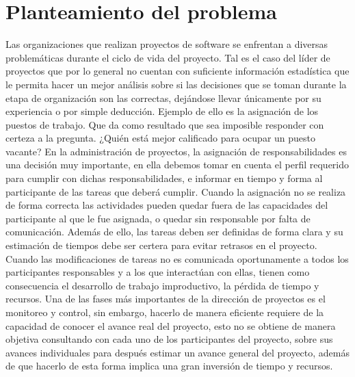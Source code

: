 \section{Planteamiento del problema }

Las organizaciones que realizan proyectos de software se enfrentan a diversas problemáticas durante el ciclo de vida del proyecto. Tal es el caso del líder de proyectos que por lo general no cuentan con suficiente información estadística que le permita hacer un mejor análisis sobre si las decisiones que se toman durante la etapa de organización son las correctas, dejándose llevar únicamente por su experiencia o por simple deducción. Ejemplo de ello es la asignación de los puestos de trabajo. Que da como resultado que sea imposible responder con certeza a la pregunta. ¿Quién está mejor calificado para ocupar un puesto vacante? 
\newline \newline
En la administración de proyectos, la asignación de responsabilidades es una decisión muy importante, en ella debemos tomar en cuenta el perfil requerido para cumplir con dichas responsabilidades, e informar en tiempo y forma al participante de las tareas que deberá cumplir. Cuando la asignación no se realiza de forma correcta las actividades pueden quedar fuera de las capacidades del participante al que le fue asignada, o quedar sin responsable por falta de comunicación. Además de ello, las tareas deben ser definidas de forma clara y su estimación de tiempos debe ser certera para evitar retrasos en el proyecto.   
\newline \newline
Cuando las modificaciones de tareas no es comunicada oportunamente a todos los participantes responsables y a los que interactúan con ellas, tienen como consecuencia el desarrollo de trabajo improductivo, la pérdida de tiempo y recursos. 
\newline \newline
Una de las fases más importantes de la dirección de proyectos es el monitoreo y control, sin embargo, hacerlo de manera eficiente requiere de la capacidad de conocer el avance real del proyecto, esto no se obtiene de manera objetiva consultando con cada uno de los participantes del proyecto, sobre sus avances individuales para después estimar un avance general del proyecto, además de que hacerlo de esta forma implica una gran inversión de tiempo y recursos.


